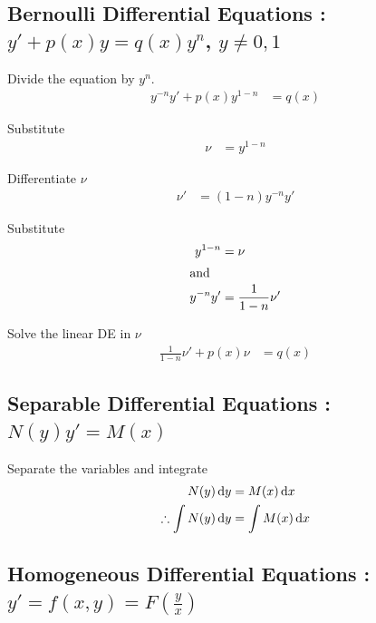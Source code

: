 \documentclass[fleqn, a4paper, 8pt, twoside]{amsart}
\theoremstyle{definition}
\theoremstyle{theorem}
\begin{document}
\begin{multicols}{2}
\begin{spacing}{0.85}
\subsection{Bernoulli Differential Equations : $y' + p(x) y = q(x) y^n$, $y \neq 0,1$}

\begin{algorithmic}[1]
	\item
		Divide the equation by $y^{n}$.
		\begin{align*}
			y^{-n} y' + p(x) y^{1 - n} &= q(x)
		\end{align*}
	\item 
		Substitute 
		\begin{align*}
			\nu &= y^{1 - n}
		\end{align*}
	\item 
		Differentiate $\nu$
		\begin{align*}
			\nu' &= (1 - n) y^{-n} y'
		\end{align*}
	\item 
		Substitute
		\begin{align*}
			y^{1 - n} &= \nu\\
			\intertext{and}
			y^{-n} y' &= \frac{1}{1 - n} \nu'
		\end{align*}
	\item 
		Solve the linear DE in $\nu$
		\begin{align*}
			\frac{1}{1 - n} \nu' + p(x) \nu &= q(x)
		\end{align*}
\end{algorithmic}

\subsection{Separable Differential Equations : $N(y) y' = M(x)$}

\begin{algorithmic}[1]
	\item 
		Separate the variables and integrate
		\begin{align*}
			N(y) \dif y &= M(x) \dif x\\
			\therefore \int N(y) \dif y &= \int M(x) \dif x
		\end{align*}
\end{algorithmic}

\subsection{Homogeneous Differential Equations : $y' = f(x,y) = F \left( \frac{y}{x} \right)$}


\end{spacing}
\end{multicols}
\end{document}
